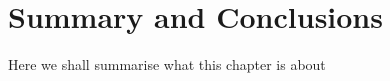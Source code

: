 \documentclass[12pt]{report}
\newcommand{\todo}[1]{{\leavevmode\color{todo}#1}}
\begin{document}
\chapter{Summary and Conclusions}
\todo{Here we shall summarise what this chapter is about}





\end{document}
